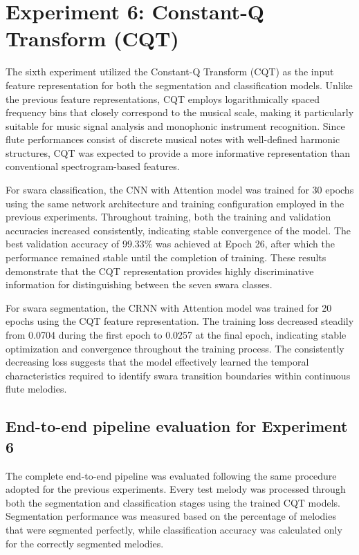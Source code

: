
\section{Experiment 6: Constant-Q Transform (CQT)}

The sixth experiment utilized the Constant-Q Transform (CQT) as the input feature representation for both the segmentation and classification models. Unlike the previous feature representations, CQT employs logarithmically spaced frequency bins that closely correspond to the musical scale, making it particularly suitable for music signal analysis and monophonic instrument recognition. Since flute performances consist of discrete musical notes with well-defined harmonic structures, CQT was expected to provide a more informative representation than conventional spectrogram-based features.

For swara classification, the CNN with Attention model was trained for 30 epochs using the same network architecture and training configuration employed in the previous experiments. Throughout training, both the training and validation accuracies increased consistently, indicating stable convergence of the model. The best validation accuracy of 99.33\% was achieved at Epoch 26, after which the performance remained stable until the completion of training. These results demonstrate that the CQT representation provides highly discriminative information for distinguishing between the seven swara classes.

For swara segmentation, the CRNN with Attention model was trained for 20 epochs using the CQT feature representation. The training loss decreased steadily from 0.0704 during the first epoch to 0.0257 at the final epoch, indicating stable optimization and convergence throughout the training process. The consistently decreasing loss suggests that the model effectively learned the temporal characteristics required to identify swara transition boundaries within continuous flute melodies.

\subsection*{End-to-end pipeline evaluation for Experiment 6}

The complete end-to-end pipeline was evaluated following the same procedure adopted for the previous experiments. Every test melody was processed through both the segmentation and classification stages using the trained CQT models. Segmentation performance was measured based on the percentage of melodies that were segmented perfectly, while classification accuracy was calculated only for the correctly segmented melodies.

